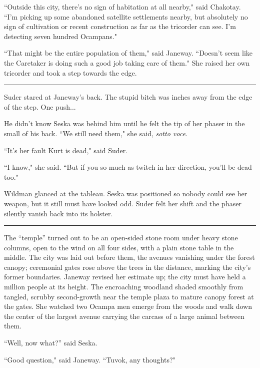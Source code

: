 \documentclass[twoside,letterpaper,12pt]{memoir}
\begin{document}
``Outside this city, there's no sign of habitation at all nearby," said Chakotay. ``I'm picking up some abandoned satellite settlements nearby, but absolutely no sign of cultivation or recent construction as far as the tricorder can see. I'm detecting seven hundred Ocampans." 

``That might be the entire population of them," said Janeway. ``Doesn't seem like the Caretaker is doing such a good job taking care of them." She raised her own tricorder and took a step towards the edge. 

\begin{center}\rule{3cm}{0.4 pt}\end{center} 

Suder stared at Janeway's back. The stupid bitch was inches away from the edge of the step. One push... 

He didn't know Seska was behind him until he felt the tip of her phaser in the small of his back. ``We still need them," she said, \textit{sotto voce}. 

``It's her fault Kurt is dead," said Suder. 

``I know," she said. ``But if you so much as twitch in her direction, you'll be dead too." 

Wildman glanced at the tableau. Seska was positioned so nobody could see her weapon, but it still must have looked odd. Suder felt her shift and the phaser silently vanish back into its holster. 

\begin{center}\rule{3cm}{0.4 pt}\end{center} 

The ``temple” turned out to be an open-sided stone room under heavy stone columns, open to the wind on all four sides, with a plain stone table in the middle. The city was laid out before them, the avenues vanishing under the forest canopy; ceremonial gates rose above the trees in the distance, marking the city’s former boundaries. Janeway revised her estimate up; the city must have held a million people at its height. The encroaching woodland shaded smoothly from tangled, scrubby second-growth near the temple plaza to mature canopy forest at the gates. She watched two Ocampa men emerge from the woods and walk down the center of the largest avenue carrying the carcass of a large animal between them. 

``Well, now what?” said Seska. 

``Good question," said Janeway. ``Tuvok, any thoughts?" 
\end{document}

